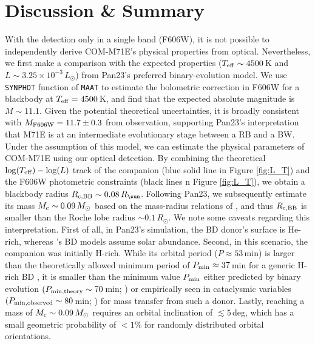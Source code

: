 \documentclass[twocolumn]{aastex631}
\begin{document}
\section{Discussion \& Summary} \label{sec:discussion}

With the detection only in a single band (F606W), it is not possible to independently derive COM-M71E's physical properties from optical. Nevertheless, we first make a comparison with the expected properties ($T_{\rm eff}\sim4500$\,K and $L\sim3.25\times10^{-3}\,L_\odot$) from Pan23's preferred binary-evolution model. We use \texttt{SYNPHOT} function of \texttt{MAAT} \citep{Ofek2014} to estimate the bolometric correction in F606W for a blackbody at $T_{\rm eff} = 4500$\,K, and find that the expected absolute magnitude is $M \sim 11.1$. Given the potential theoretical uncertainties, it is broadly consistent with $M_{\rm F606W} = 11.7\pm0.3$ from observation, supporting Pan23's interpretation that M71E is at an intermediate evolutionary stage between a RB and a BW. Under the assumption of this model, we can estimate the physical parameters of COM-M71E using our optical detection. By combining the theoretical $\log(T_{\rm eff})-\log(L)$ track of the companion (blue solid line in Figure \ref{fig:L_T}) and the F606W photometric constraints (black lines n Figure \ref{fig:L_T}), we obtain a blackbody radius $R_{\rm c, BB} \sim 0.08\,R_\sun$. Following Pan23, we subsequently estimate its mass $M_{\rm c} \sim 0.09\,M_\odot$ based on the mass-radius relations of \citet{Burrows1993}, and thus $R_{\rm c, BB}$ is smaller than the Roche lobe radius $\sim 0.1\,R_\odot$. We note some caveats regarding this interpretation. First of all, in Pan23's simulation, the BD donor's surface is He-rich, whereas \citet{Burrows1993}'s BD models assume solar abundance. Second, in this scenario, the companion was initially H-rich. While its orbital period ($P\approx53$\,min) is larger than the theoretically allowed minimum period of $P_{\rm min} \approx 37$\,min for a generic H-rich BD \citep{Rappaport2021}, it is smaller than the minimum value $P_{\rm min}$ either predicted by binary evolution $(P_{\rm min, theory}\sim 70$\,min; \citealt{KolbBaraffe1999}) or empirically seen in cataclysmic variables $(P_{\rm min, observed} \sim 80$\,min; \citealt{Knigge2006, Gansicke2009}) for mass transfer from such a donor. Lastly, reaching a mass of $M_{\rm c} \sim 0.09\,M_\odot$ requires an orbital inclination of $\lesssim 5$\,deg, which has a small geometric probability of $<1\%$ for randomly distributed orbital orientations.
\end{document}

